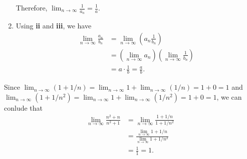 \begin{dem}{}{}
\begin{enumerate}
			Therefore, \(\lim_{n\to\infty} \frac{1}{a_n} = \frac{1}{a}\).
		\item Using \textbf{ii} and \textbf{iii}, we have 
			\begin{align*}
				\lim_{n\to\infty} \frac{a_n}{b_n} &= \lim_{n\to\infty} \left( a_n \frac{1}{b_n} \right) \\
												  &= \left(\lim_{n\to\infty} a_n\right) \left(\lim_{n\to\infty}\frac{1}{b_n} \right) \\
												  &= a\cdot \frac{1}{b} = \frac{a}{b}. 
			\end{align*}
	\end{enumerate}
\end{dem}

\begin{exmp}{}{}
	Since \(\lim_{n\to\infty} (1 + 1/n) = \lim_{n\to\infty} 1 + \lim_{n\to\infty} (1/n) = 1 + 0 = 1\)
	and \(\lim_{n\to\infty} (1 + 1/n^2) = \lim_{n\to\infty} 1 + \lim_{n\to\infty} (1/n^2) = 1 + 0 = 1\), we can conlude that
	\begin{align*}
		\lim_{n\to\infty} \frac{n^2 + n}{n^2 + 1} &= \lim_{n\to\infty} \frac{1 + 1/n}{1 + 1/n^2} \\
												  &= \frac{\lim_{n\to\infty} 1 + 1/n}{\lim_{n\to\infty} 1 + 1/n^2} \\
												  &= \frac{1}{1} = 1.
	\end{align*}
\end{exmp}
